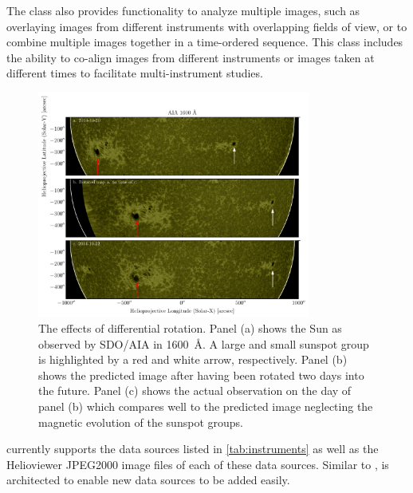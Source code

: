 The \Map class also provides functionality to analyze multiple images, such as overlaying images from different instruments with overlapping fields of view, or to combine multiple images together in a time-ordered sequence.
This class includes the ability to co-align images from different instruments or images taken at different times to facilitate multi-instrument studies.


\begin{figure}
    \center
    \includegraphics[width = 0.8\textwidth]{figures/fig_diff_rot_1600.pdf}
    \caption{The effects of differential rotation.
    Panel (a) shows the Sun as observed by SDO/AIA in 1600~\AA.
    A large and small sunspot group is highlighted by a red and white arrow, respectively.
    Panel (b) shows the predicted image after having been rotated two days into the future.
    Panel (c) shows the actual observation on the day of panel (b) which compares well to the predicted image neglecting the magnetic evolution of the sunspot groups.}
    \label{fig:diff_rot}
\end{figure}

\Map currently supports the data sources listed in \autoref{tab:instruments} as well as the Helioviewer JPEG2000 image files of  each of these data sources. Similar to \Timeseries, \Map is architected to enable new data sources to be added easily.
